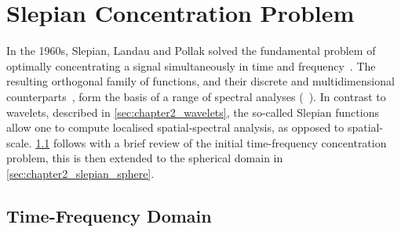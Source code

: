 



\section{Slepian Concentration Problem}\label{sec:chapter2_slepian_concentration_problem}

In the 1960s, Slepian, Landau and Pollak solved the fundamental problem of optimally concentrating a signal simultaneously in time and frequency~\cite{Landau1961,Landau1962,Slepian1983,Slepian1961}.
The resulting orthogonal family of functions, and their discrete and multidimensional counterparts~\cite{Bronez1988,Hanssen1997,Liu1992,Slepian1964,Slepian1978}, form the basis of a range of spectral analyses (\eg{}~\cite{Thomson1982,Thomson1990}).
In contrast to wavelets, described in \cref{sec:chapter2_wavelets}, the so-called Slepian functions allow one to compute localised spatial-spectral analysis, as opposed to spatial-scale.
\cref{sec:chapter2_slepian_euclidean} follows with a brief review of the initial time-frequency concentration problem, this is then extended to the spherical domain in \cref{sec:chapter2_slepian_sphere}.

\subsection{Time-Frequency Domain}\label{sec:chapter2_slepian_euclidean}

